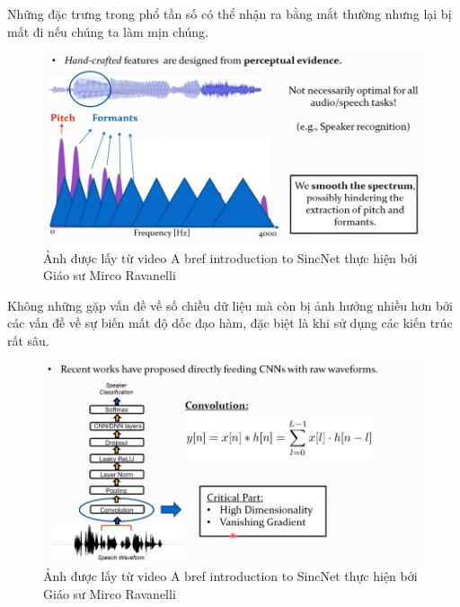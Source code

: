 \documentclass{article}
\begin{document}
	Những đặc trưng trong phổ tần số có thể nhận ra bằng mắt thường nhưng lại bị mất đi nếu chúng ta làm mịn chúng.
	\begin{figure}[H]
		\centering
		\includegraphics[width=1\textwidth]{images/perceptual_evidence.png}
		\caption{Ảnh được lấy từ video A bref introduction to SincNet thực hiện bởi Giáo sư Mirco Ravanelli}
		\label{fig:writing-thesis}
	\end{figure}
	
	Không những gặp vấn đề về số chiều dữ liệu mà còn bị ảnh hưởng nhiều hơn bởi các vấn đề về sự biến mất độ dốc đạo hàm, đặc biệt là khi sử dụng các kiến trúc rất sâu.
	\begin{figure}[H]
		\centering
		\includegraphics[width=1\textwidth]{images/cnns_problems.png}
		\caption{Ảnh được lấy từ video A bref introduction to SincNet thực hiện bởi Giáo sư Mirco Ravanelli}
		\label{fig:writing-thesis}
	\end{figure}
	
\end{document}
